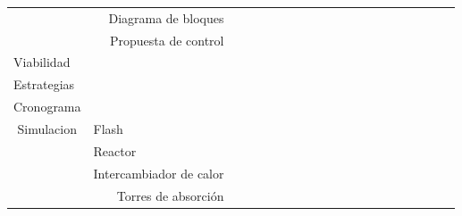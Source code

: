 \begin{table}[htbp]
\begin{turn}{90}
\begin{tabular}{lr|rrrrrrrrrrrrrrrrrr}
  \cmidrule{2-20}          & \multicolumn{1}{p{6.11em}|}{Diagrama de bloques} &       &       &       &       & \cellcolor[rgb]{ .776,  .937,  .808}\textcolor[rgb]{ 0,  .38,  0}{} &       &       &       &       &       &       &       &       &       &       &       &       &  \\
  \cmidrule{2-20}          & \multicolumn{1}{p{6.11em}|}{Propuesta de control} &       &       &       &       &       & \cellcolor[rgb]{ .776,  .937,  .808}\textcolor[rgb]{ 0,  .38,  0}{} &       &       &       &       &       &       &       &       &       &       &       &  \\
      \midrule
      Viabilidad &       &       &       &       &       &       &       & \cellcolor[rgb]{ .776,  .937,  .808}\textcolor[rgb]{ 0,  .38,  0}{} &       &       &       &       &       &       &       &       &       &       &  \\
      \midrule
      Estrategias &       &       &       &       &       &       &       &       & \cellcolor[rgb]{ .776,  .937,  .808}\textcolor[rgb]{ 0,  .38,  0}{} &       &       &       &       &       &       &       &       &       &  \\
      \midrule
      Cronograma &       &       &       &       &       &       &       &       &       & \cellcolor[rgb]{ .776,  .937,  .808}\textcolor[rgb]{ 0,  .38,  0}{} &       &       &       &       &       &       &       &       &  \\
      \midrule
      \multicolumn{1}{c}{\multirow{5}[10]{*}{Simulacion}} & \multicolumn{1}{l|}{Flash} &       &       &       &       &       &       &       &       &       & \cellcolor[rgb]{ .776,  .937,  .808}\textcolor[rgb]{ 0,  .38,  0}{} &       &       &       &       &       &       &       &  \\
  \cmidrule{2-20}          & \multicolumn{1}{l|}{Reactor} &       &       &       &       &       &       &       &       &       &       & \cellcolor[rgb]{ .776,  .937,  .808}\textcolor[rgb]{ 0,  .38,  0}{} &       &       &       &       &       &       &  \\
  \cmidrule{2-20}          & \multicolumn{1}{p{6.11em}|}{Intercambiador de calor} &       &       &       &       &       &       &       &       &       &       & \cellcolor[rgb]{ .776,  .937,  .808}\textcolor[rgb]{ 0,  .38,  0}{} &       &       &       &       &       &       &  \\
  \cmidrule{2-20}          & \multicolumn{1}{p{6.11em}|}{Torres de absorción} &       &       &       &       &       &       &       &       &       &       &       & \cellcolor[rgb]{ .776,  .937,  .808}\textcolor[rgb]{ 0,  .38,  0}{} &       &       &       &       &       &  \\

\end{tabular}
\end{turn}
\end{table}
